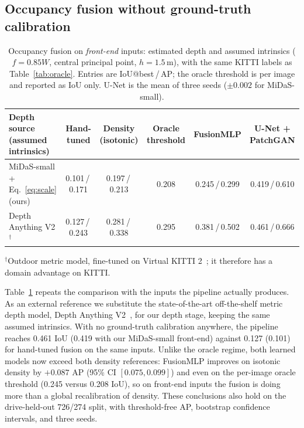 \documentclass[sigconf]{acmart}
\newenvironment{revised}{\color{revcolor}}{}
\begin{document}
\begin{revised}
\subsection{Occupancy fusion without ground-truth calibration}\label{sec:frontend}

\begin{table}[t]
\caption{Occupancy fusion on \emph{front-end} inputs: estimated depth and assumed intrinsics ($f{=}0.85W$, central principal point, $h{=}1.5$\,m), with the same KITTI labels as Table~\ref{tab:oracle}. Entries are IoU@best\,/\,AP; the oracle threshold is per image and reported as IoU only. U-Net is the mean of three seeds ($\pm0.002$ for MiDaS-small).}
\label{tab:frontend}
\begin{tabular}{lccccc}
\toprule
Depth source (assumed intrinsics) & Hand-tuned & Density (isotonic) & Oracle threshold & FusionMLP & U-Net + PatchGAN \\
\midrule
MiDaS-small + Eq.~\eqref{eq:scale} (ours) & 0.101\,/\,0.171 & 0.197\,/\,0.213 & 0.208 & 0.245\,/\,0.299 & 0.419\,/\,0.610 \\
Depth Anything V2$^\dagger$ & 0.127\,/\,0.243 & 0.281\,/\,0.338 & 0.295 & 0.381\,/\,0.502 & 0.461\,/\,0.666 \\
\bottomrule
\end{tabular}

\vspace{2pt}
\raggedright\small $^\dagger$Outdoor metric model, fine-tuned on Virtual KITTI 2~\cite{cabon2020vkitti2}; it therefore has a domain advantage on KITTI.
\end{table}

Table~\ref{tab:frontend} repeats the comparison with the inputs the pipeline actually produces. As an external reference we substitute the state-of-the-art off-the-shelf metric depth model, Depth Anything V2~\cite{yang2024depthanythingv2}, for our depth stage, keeping the same assumed intrinsics. With no ground-truth calibration anywhere, the pipeline reaches 0.461 IoU (0.419 with our MiDaS-small front-end) against 0.127 (0.101) for hand-tuned fusion on the same inputs. Unlike the oracle regime, both learned models now exceed both density references: FusionMLP improves on isotonic density by $+0.087$ AP (95\% CI $[0.075, 0.099]$) and even on the per-image oracle threshold (0.245 versus 0.208 IoU), so on front-end inputs the fusion is doing more than a global recalibration of density. These conclusions also hold on the drive-held-out 726/274 split, with threshold-free AP, bootstrap confidence intervals, and three seeds.


\end{revised}
\end{document}
